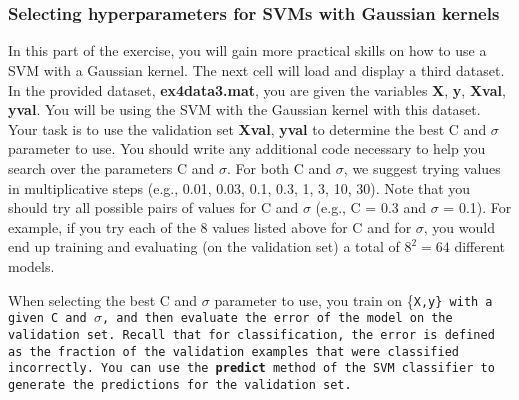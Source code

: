 \documentclass[11pt]{article}
\begin{document}
    \begin{center}
    \end{center}
    { \hspace*{\fill} \\}
    
    \begin{center}
    \end{center}
    { \hspace*{\fill} \\}
    
    \hypertarget{selecting-hyperparameters-for-svms-with-gaussian-kernels}{%
\subsubsection{Selecting hyperparameters for SVMs with Gaussian
kernels}\label{selecting-hyperparameters-for-svms-with-gaussian-kernels}}

In this part of the exercise, you will gain more practical skills on how
to use a SVM with a Gaussian kernel. The next cell will load and display
a third dataset. In the provided dataset, \textbf{ex4data3.mat}, you are
given the variables \textbf{X}, \textbf{y}, \textbf{Xval},
\textbf{yval}. You will be using the SVM with the Gaussian kernel with
this dataset. Your task is to use the validation set \textbf{Xval},
\textbf{yval} to determine the best C and \(\sigma\) parameter to use.
You should write any additional code necessary to help you search over
the parameters C and \(\sigma\). For both C and \(\sigma\), we suggest
trying values in multiplicative steps (e.g., 0.01, 0.03, 0.1, 0.3, 1, 3,
10, 30). Note that you should try all possible pairs of values for C and
\(\sigma\) (e.g., C = 0.3 and \(\sigma\) = 0.1). For example, if you try
each of the 8 values listed above for C and for \(\sigma\), you would
end up training and evaluating (on the validation set) a total of
\(8^2 = 64\) different models.

When selecting the best C and \(\sigma\) parameter to use, you train on
\{\tt X,y\} with a given C and \(\sigma\), and then evaluate the error
of the model on the validation set. Recall that for classification, the
error is defined as the fraction of the validation examples that were
classified incorrectly. You can use the \textbf{predict} method of the
SVM classifier to generate the predictions for the validation set.
\end{document}
